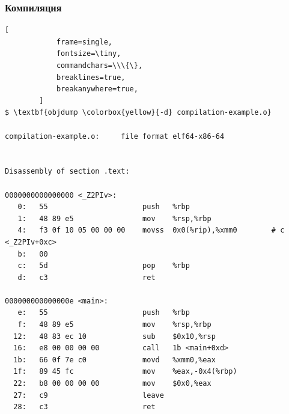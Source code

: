 \documentclass[compress]{beamer}
\begin{document}
\begin{frame}[fragile]

    \frametitle{Компиляция}

        \begin{Verbatim}[
            frame=single,
            fontsize=\tiny,
            commandchars=\\\{\},
            breaklines=true,
            breakanywhere=true,
        ]
$ \textbf{objdump \colorbox{yellow}{-d} compilation-example.o}

compilation-example.o:     file format elf64-x86-64


Disassembly of section .text:

0000000000000000 <_Z2PIv>:
   0:   55                      push   %rbp
   1:   48 89 e5                mov    %rsp,%rbp
   4:   f3 0f 10 05 00 00 00    movss  0x0(%rip),%xmm0        # c <_Z2PIv+0xc>
   b:   00
   c:   5d                      pop    %rbp
   d:   c3                      ret

000000000000000e <main>:
   e:   55                      push   %rbp
   f:   48 89 e5                mov    %rsp,%rbp
  12:   48 83 ec 10             sub    $0x10,%rsp
  16:   e8 00 00 00 00          call   1b <main+0xd>
  1b:   66 0f 7e c0             movd   %xmm0,%eax
  1f:   89 45 fc                mov    %eax,-0x4(%rbp)
  22:   b8 00 00 00 00          mov    $0x0,%eax
  27:   c9                      leave
  28:   c3                      ret
        \end{Verbatim}

    \centering

\end{frame}
\end{document}
